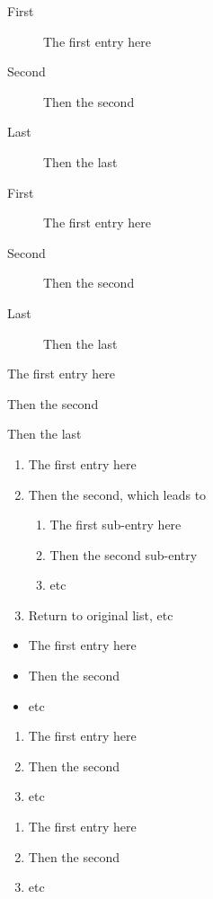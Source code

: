 \documentclass[11pt]{article}
\begin{document}
\begin{description}
\item[\color{red}First] The first entry here
\item[\color{blue}Second] Then the second
\item[\color{black}Last] Then the last
\end{description}

\begin{description}
\item[First] The first entry here
\item[Second] Then the second
\item[Last] Then the last
\end{description}

\begin{description}
\item The first entry here
\item Then the second
\item Then the last
\end{description}

\begin{enumerate}
\item The first entry here
\item Then the second, which leads to
\begin{enumerate}
\item The first sub-entry here
\item Then the second sub-entry
\item etc
\end{enumerate}
\item Return to original list, etc
\end{enumerate}

\renewcommand{\labelitemi}{\textgreater}
\begin{itemize}
\item The first entry here
\item Then the second
\item etc
\end{itemize}

\begin{enumerate}[Exerc{i}se 1)]
\item The first entry here
\item Then the second
\item etc
\end{enumerate}

\begin{enumerate}[Exercise 1)]
\item The first entry here
\item Then the second
\item etc
\end{enumerate}
\end{document}
